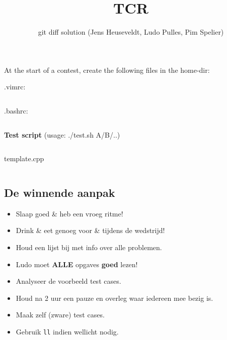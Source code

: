 \documentclass[8pt,a4paper,landscape,oneside]{amsart}
\title{TCR}
\subtitle{git diff solution (Jens Heuseveldt, Ludo Pulles, Pim Spelier)}
\newcommand{\code}[1]{\inputminted[fontsize=\normalsize,baselinestretch=1,breaklines,tabsize=2]{cpp}{code/#1}}
\begin{document}
\begin{multicols*}{3}
\maketitle
\begin{comment}
\begin{center}
	\makeatletter
	\textbf{\@title} \\
	\emph{\@author}
	\makeatother
\end{center}
\end{comment}

\tableofcontents

\begin{center}
At the start of a contest, create the following files in the home-dir:
\end{center}

.vimrc: \inputminted[fontsize=\normalsize,baselinestretch=1,breaklines,linenos,tabsize=2]{vim}{code/.vimrc}
.bashrc: \inputminted[fontsize=\normalsize,baselinestretch=1,breaklines,linenos,tabsize=2]{bash}{code/.bashrc}
\textbf{Test script} (usage: ./test.sh A/B/..)
\inputminted[fontsize=\normalsize,baselinestretch=1,breaklines,tabsize=2]{bash}{code/test.sh}

\begin{center}
template.cpp
\end{center}

\code{T.cpp}

\subsection{De winnende aanpak}

\begin{itemize}
	\setlength\itemsep{-.25em}
	\item Slaap goed \& heb een vroeg ritme!
	\item Drink \& eet genoeg voor \& tijdens de wedstrijd!
	\item Houd een lijst bij met info over alle problemen.
	\item Ludo moet {\huge\textbf{ALLE}} opgaves \textbf{goed} lezen!
	\item Analyseer de voorbeeld test cases.
	\item Houd na 2 uur een pauze en overleg waar iedereen mee bezig is.
	\item Maak zelf (zware) test cases.
	\item Gebruik \texttt{ll} indien wellicht nodig.
\end{itemize}


\end{multicols*}
\end{document}
